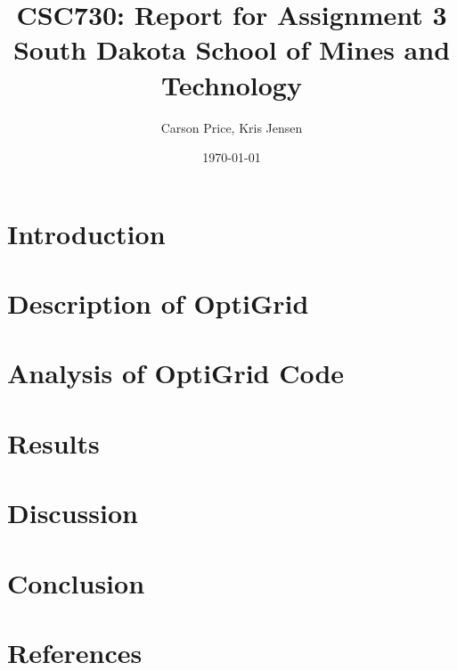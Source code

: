 \documentclass{article}
\begin{document}
\onecolumn %
\setlength{\droptitle}{-6em} 
\title{CSC730: Report for Assignment 3 \\ \large South Dakota School of Mines and Technology}
\author{Carson Price, Kris Jensen}

\date{\today}
\maketitle

\begin{multicols}{2} %
    \let\clearpage\relax
    \section{Introduction}
    
    
    \let\clearpage\relax
    \section{Description of OptiGrid}
    

    \let\clearpage\relax
    \section{Analysis of OptiGrid Code}
    

    \let\clearpage\relax
    \section{Results}
    

    \let\clearpage\relax
    \section{Discussion}
    

    \let\clearpage\relax
    \section{Conclusion}
    

    \let\clearpage\relax
    \section{References}
    

\end{multicols}
\end{document}
